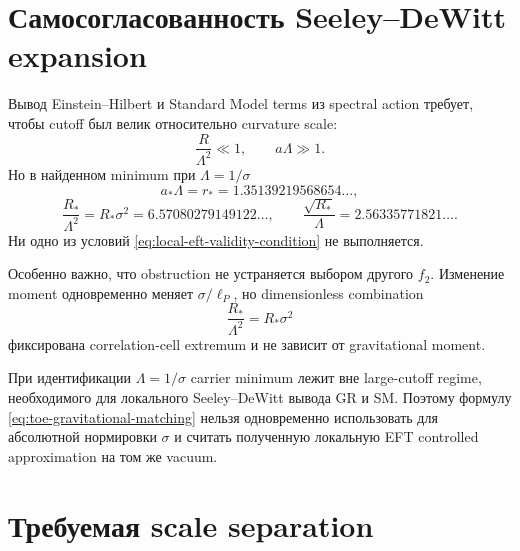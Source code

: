 \section{Самосогласованность Seeley--DeWitt expansion}

Вывод Einstein--Hilbert и Standard Model terms из spectral action требует,
чтобы cutoff был велик относительно curvature scale:
\begin{equation}
 \frac{R}{\Lambda^2}\ll1,
 \qquad
 a\Lambda\gg1.
 \label{eq:local-eft-validity-condition}
\end{equation}
Но в найденном minimum при \(\Lambda=1/\sigma\)
\begin{equation}
 a_*\Lambda=r_*=1.35139219568654\ldots,
\end{equation}
\begin{equation}
 \frac{R_*}{\Lambda^2}
 =R_*\sigma^2
 =6.57080279149122\ldots,
 \qquad
 \frac{\sqrt{R_*}}\Lambda=2.56335771821\ldots.
 \label{eq:selected-radius-invalid-expansion}
\end{equation}
Ни одно из условий \eqref{eq:local-eft-validity-condition} не выполняется.

Особенно важно, что obstruction не устраняется выбором другого \(f_2\).
Изменение moment одновременно меняет \(\sigma/\ell_P\), но dimensionless
combination
\begin{equation}
 \frac{R_*}{\Lambda^2}=R_*\sigma^2
\end{equation}
фиксирована correlation-cell extremum и не зависит от gravitational moment.

\begin{theorem}
При идентификации \(\Lambda=1/\sigma\) carrier minimum лежит вне
large-cutoff regime, необходимого для локального Seeley--DeWitt вывода GR и
SM. Поэтому формулу \eqref{eq:toe-gravitational-matching} нельзя одновременно
использовать для абсолютной нормировки \(\sigma\) и считать полученную
локальную EFT controlled approximation на том же vacuum.
\end{theorem}

\section{Требуемая scale separation}

